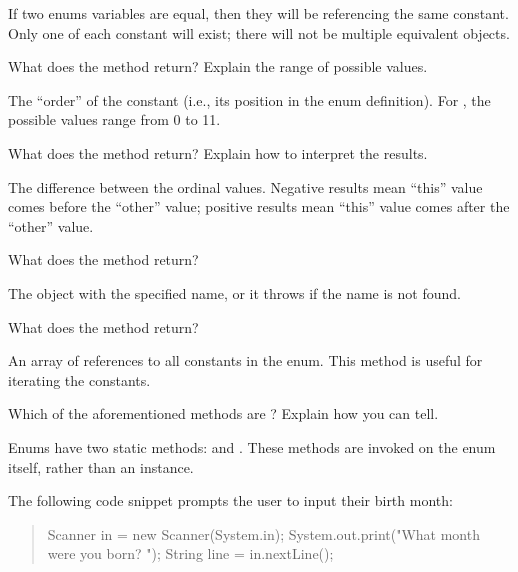 \begin{answer}
If two enums variables are equal, then they will be referencing the same constant.
Only one of each constant will exist; there will not be multiple equivalent  objects.
\end{answer}


\Q What does the  method return?
Explain the range of possible values.

\begin{answer}
The ``order'' of the constant (i.e., its position in the enum definition).
For , the possible values range from 0 to 11.
\end{answer}


\Q What does the  method return?
Explain how to interpret the results.

\begin{answer}
The difference between the ordinal values.
Negative results mean ``this'' value comes before the ``other'' value;
positive results mean ``this'' value comes after the ``other'' value.
\end{answer}


\Q What does the  method return?

\begin{answer}[3em]
The  object with the specified name, or it throws  if the name is not found.
\end{answer}


\Q What does the  method return?

\begin{answer}[3em]
An array of references to all constants in the enum.
This method is useful for iterating the constants.
\end{answer}


\Q Which of the aforementioned methods are ?
Explain how you can tell.

\begin{answer}
Enums have two static methods:  and .
These methods are invoked on the enum itself, rather than an instance.
\end{answer}


\Q \label{key2}
The following code snippet prompts the user to input their birth month:

\begin{quote}
\begin{javalst}
Scanner in = new Scanner(System.in);
System.out.print("What month were you born? ");
String line = in.nextLine();
\end{javalst}
\end{quote}

